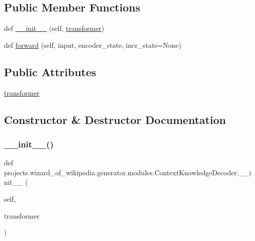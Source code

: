 \subsection*{Public Member Functions}
\begin{DoxyCompactItemize}
\item 
def \hyperlink{classprojects_1_1wizard__of__wikipedia_1_1generator_1_1modules_1_1ContextKnowledgeDecoder_af3dfc40d3aefbe0588b4ab321b6183af}{\+\_\+\+\_\+init\+\_\+\+\_\+} (self, \hyperlink{classprojects_1_1wizard__of__wikipedia_1_1generator_1_1modules_1_1ContextKnowledgeDecoder_a83385b523ae134dcf14e6bc0a9a82b8c}{transformer})
\item 
def \hyperlink{classprojects_1_1wizard__of__wikipedia_1_1generator_1_1modules_1_1ContextKnowledgeDecoder_ae03a16501c3035669816ceb5eb8678f7}{forward} (self, input, encoder\+\_\+state, incr\+\_\+state=None)
\end{DoxyCompactItemize}
\subsection*{Public Attributes}
\begin{DoxyCompactItemize}
\item 
\hyperlink{classprojects_1_1wizard__of__wikipedia_1_1generator_1_1modules_1_1ContextKnowledgeDecoder_a83385b523ae134dcf14e6bc0a9a82b8c}{transformer}
\end{DoxyCompactItemize}


\subsection{Constructor \& Destructor Documentation}
\mbox{\label{classprojects_1_1wizard__of__wikipedia_1_1generator_1_1modules_1_1ContextKnowledgeDecoder_af3dfc40d3aefbe0588b4ab321b6183af}} 
\subsubsection{\texorpdfstring{\+\_\+\+\_\+init\+\_\+\+\_\+()}{\_\_init\_\_()}}
{\footnotesize\ttfamily def projects.\+wizard\+\_\+of\+\_\+wikipedia.\+generator.\+modules.\+Context\+Knowledge\+Decoder.\+\_\+\+\_\+init\+\_\+\+\_\+ (\begin{DoxyParamCaption}\item[{}]{self,  }\item[{}]{transformer }\end{DoxyParamCaption})}



